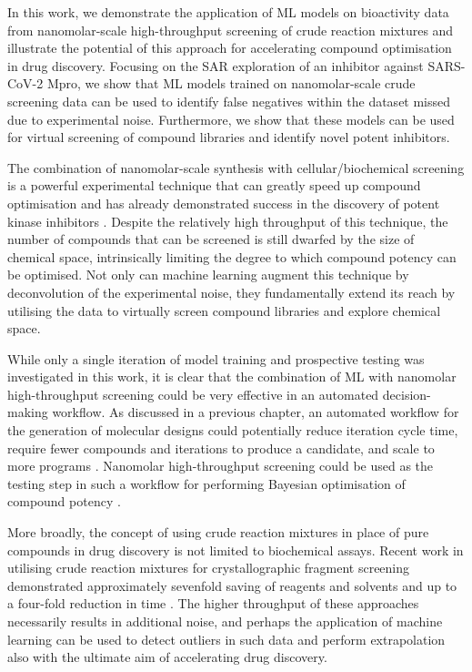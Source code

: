 In this work, we demonstrate the application of ML models on bioactivity data from nanomolar-scale high-throughput screening of crude reaction mixtures and illustrate the potential of this approach for accelerating compound optimisation in drug discovery. Focusing on the SAR exploration of an inhibitor against SARS-CoV-2 Mpro, we show that ML models trained on nanomolar-scale crude screening data can be used to identify false negatives within the dataset missed due to experimental noise. Furthermore, we show that these models can be used for virtual screening of compound libraries and identify novel potent inhibitors.

The combination of nanomolar-scale synthesis with cellular/biochemical screening is a powerful experimental technique that can greatly speed up compound optimisation and has already demonstrated success in the discovery of potent kinase inhibitors \cite{Gesmundo2018nanosar, Gehrtz2022nanomolar}. Despite the relatively high throughput of this technique, the number of compounds that can be screened is still dwarfed by the size of chemical space, intrinsically limiting the degree to which compound potency can be optimised. Not only can machine learning augment this technique by deconvolution of the experimental noise, they fundamentally extend its reach by utilising the data to virtually screen compound libraries and explore chemical space.

While only a single iteration of model training and prospective testing was investigated in this work, it is clear that the combination of ML with nanomolar high-throughput screening could be very effective in an automated decision-making workflow. As discussed in a previous chapter, an automated workflow for the generation of molecular designs could potentially reduce iteration cycle time, require fewer compounds and iterations to produce a candidate, and scale to more programs \cite{Schneider2018AutomatingDrugDiscovery, Coley2020Outlook, Goldman2022ChemicalDesignLevels}. Nanomolar high-throughput screening could be used as the testing step in such a workflow for performing Bayesian optimisation of compound potency \cite{korovina2019chembo}.

More broadly, the concept of using crude reaction mixtures in place of pure compounds in drug discovery is not limited to biochemical assays. Recent work in utilising crude reaction mixtures for crystallographic fragment screening demonstrated approximately sevenfold saving of reagents and solvents and up to a four-fold reduction in time \cite{Baker2020FragementsFromCrude}. The higher throughput of these approaches necessarily results in additional noise, and perhaps the application of machine learning can be used to detect outliers in such data and perform extrapolation also with the ultimate aim of accelerating drug discovery.

